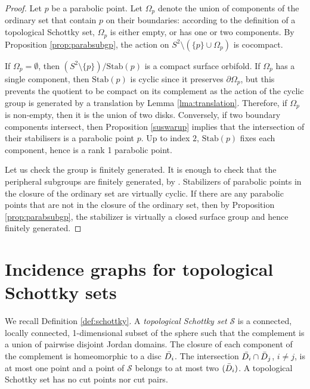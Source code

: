\documentclass[11pt]{article}
\theoremstyle{definition}
\newcommand\Stab{\text{Stab}}
\begin{document}
\begin{proof} Let $p$ be a parabolic point. Let $\Omega_p$ denote the union of components of the ordinary set that contain $p$ on their
boundaries: according to the definition of a topological Schottky set, $\Omega_p$ is either empty, or has one or two components. By  Proposition \ref{prop:parabsubgp}, the action
on  $S^2\setminus (\{p\}\cup\Omega_p)$ is cocompact. 

If $\Omega_p=\emptyset$, then  $(S^2\setminus\{p\})/\Stab (p)$ is a compact surface orbifold.  If $\Omega_p$ has a single component,
then $\Stab (p)$ is cyclic since it preserves $\partial\Omega_p$, but this prevents the quotient to be compact on its complement as the action of 
the cyclic group is generated by a translation by Lemma \ref{lma:translation}. Therefore, if $\Omega_p$ is non-empty, then it is the
union of two disks. Conversely, if two boundary components intersect, then Proposition \ref{suswarup} implies that the intersection
of their stabilisers  is a parabolic point $p$. Up to index $2$, $\Stab (p)$ fixes each component, hence is a rank 1 parabolic point.

Let us check the group is finitely generated. It is enough to check that the peripheral subgroups are finitely generated, by \cite[Corollary p 371]{GPnonfg}. Stabilizers of parabolic points in the closure of the ordinary set are virtually cyclic. If there are any parabolic points that are not in the closure of the ordinary set, then by Proposition \ref{prop:parabsubgp}, the stabilizer is virtually a closed surface group and hence finitely generated.  
\end{proof}





\section{Incidence graphs for topological Schottky sets} 
\label{sec:incidence} 
We recall Definition \ref{def:schottky}.  A {\it topological Schottky set} $\mathcal{S}$  is a  connected, locally connected, 1-dimensional subset of the sphere such that
the complement is a union of pairwise disjoint Jordan domains. The closure of each component of the complement is homeomorphic to a disc $\Bar{D_i}$.  The intersection $\Bar{D_i} \cap \Bar D_j$,  $i\neq j$, is at most one point and a point of $\mathcal{S}$ belongs to at most two $(\Bar D_i)$. A topological Schottky set has no cut points nor cut pairs.  
\end{document}
